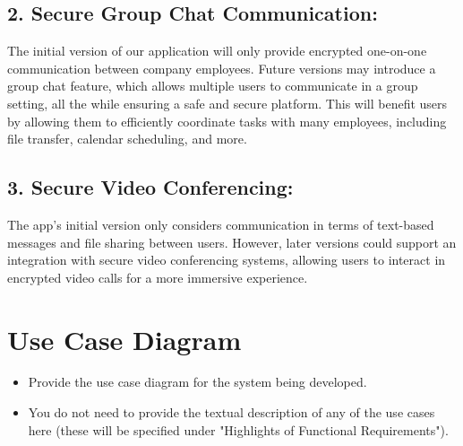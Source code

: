\documentclass[]{article}
\begin{document}
\subsection*{2. Secure Group Chat Communication:}
The initial version of our application will only provide encrypted one-on-one communication between company employees. Future versions may introduce a group chat feature, which allows multiple users to communicate in a group setting, all the while ensuring a safe and secure platform. This will benefit users by allowing them to efficiently coordinate tasks with many employees, including file transfer, calendar scheduling, and more.

\subsection*{3. Secure Video Conferencing:}
The app’s initial version only considers communication in terms of text-based messages and file sharing between users. However, later versions could support an integration with secure video conferencing systems, allowing users to interact in encrypted video calls for a more immersive experience.

\section{Use Case Diagram}
\label{sec:use_case_diagram}
\begin{itemize}
	\item Provide the use case diagram for the system being developed.
	\item You do not need to provide the textual description of any of the use cases here (these will be specified under "Highlights of Functional Requirements").
\end{itemize}
\end{document}
